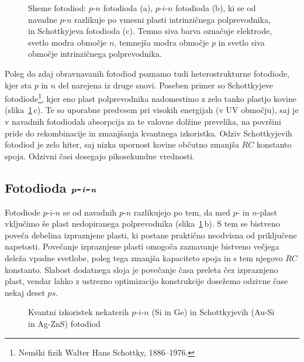 \begin{figure}[h]
\centering
\def\svgwidth{140truemm} 

\caption{Sheme fotodiod: $p$-$n$ fotodioda (a), $p$-$i$-$n$ fotodioda (b),  ki se od 
navadne $p$-$n$ razlikuje po vmesni plasti intrinzičnega
polprevodnika, in Schottkyjeva fotodioda (c). 
Temno siva barva označuje elektrode, svetlo modra območje $n$, 
temnejša modra območje $p$ in svetlo siva območje intrinzičnega polprevodnika. }
\label{11_shema}
\end{figure}
\begin{remark}
Poleg do zdaj obravnavanih fotodiod poznamo tudi heterostrukturne 
fotodiode, kjer sta $p$ in $n$ del
narejena iz druge snovi. Poseben primer so Schottkyjeve fotodiode\footnote{Nemški fizik
Walter Hans Schottky, 1886--1976.}, kjer eno plast polprevodnika
nadomestimo z zelo tanko plastjo kovine (slika~\ref{11_shema}\,c). Te so uporabne predvsem pri 
visokih energijah (v UV območju), 
saj je v navadnih fotodiodah absorpcija za te valovne dolžine prevelika, na površini pride do 
rekombinacije in zmanjšanja kvantnega izkoristka. Odziv Schottkyjevih fotodiod je zelo hiter, 
saj nizka upornost kovine občutno zmanjša $RC$ konstanto spoja. Odzivni časi 
dosegajo pikosekundne vrednosti. 
\end{remark}

\subsection*{Fotodioda $\textbf{\textit{p}}$-$\textbf{\textit{i}}$-$\textbf{\textit{n}}$}
Fotodiode $p$-$i$-$n$ se od navadnih $p$-$n$ razlikujejo po tem, da med $p$- in $n$-plast 
vključimo še plast nedopiranega polprevodnika (slika~\ref{11_shema}\,b). 
S tem se bistveno poveča debelina
izpraznjene plasti, ki postane praktično neodvisna od priključene napetosti.
Povečanje izpraznjene plasti omogoča zaznavanje bistveno večjega deleža vpadne svetlobe, 
poleg tega zmanjša kapaciteto spoja in s tem njegovo $RC$ konstanto. Slabost dodatnega
sloja je povečanje časa preleta čez izpraznjeno plast, vendar lahko
z ustrezno optimizacijo konstrukcije dosežemo odzivne čase nekaj deset $\si{ps}$.

\begin{figure}[h]
\centering
\def\svgwidth{120truemm} 

\caption{Kvantni izkoristek nekaterih $p$-$i$-$n$ (Si in Ge) in Schottkyjevih (Au-Si in Ag-ZnS)
fotodiod}
\label{11_odziv}
\end{figure}

